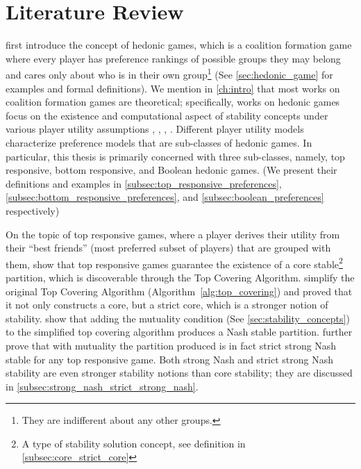 \chapter{Literature Review}
\label{ch:review}

 first introduce the concept of hedonic games,
which is a coalition formation game where every player has preference rankings
of possible groups they may belong and cares only about who is in their own group\footnote{They are indifferent about any other groups.} (See 
\autoref{sec:hedonic_game} for examples and formal definitions).
We mention in \autoref{ch:intro} that most works on coalition formation games
are theoretical; specifically, works on hedonic games focus on the existence
and computational aspect of stability concepts under various player utility
assumptions \cite {BOGOMOLNAIA2002201}, \cite{Aziz:2012:ESH:2343776.2343806},
\cite{aziz_savani_moulin_2016}, \cite{Aziz:2016:BHG:3032027.3032048}.
Different player utility models characterize preference models that are
sub-classes of hedonic games.
In particular, this thesis is primarily concerned with three sub-classes,
namely, top responsive, bottom responsive, and Boolean hedonic games.
(We present their definitions and examples in 
\autoref{subsec:top_responsive_preferences}, 
\autoref{subsec:bottom_responsive_preferences}, and 
\autoref{subsec:boolean_preferences} respectively)

On the topic of top responsive games, where a player derives their utility 
from their ``best friends'' (most preferred subset of players) that are grouped with them,
 show that top responsive games guarantee the
existence of a core stable\footnote{A type of stability solution concept, see
definition in \autoref{subsec:core_strict_core}} partition, which is 
discoverable through the Top Covering Algorithm.
 simplify the original Top Covering Algorithm
(Algorithm~\ref{alg:top_covering}) and proved that it not only constructs a
core, but a strict core, which is a stronger notion of stability.
 show that adding the mutuality condition (See
\autoref{sec:stability_concepts}) to the simplified top covering algorithm
produces a Nash stable partition.
 further prove that with mutuality
the partition produced is in fact strict strong Nash stable for any top
responsive game.
Both strong Nash and strict strong Nash stability are even stronger stability
notions than core stability; they are discussed in  
\autoref{subsec:strong_nash_strict_strong_nash}.

